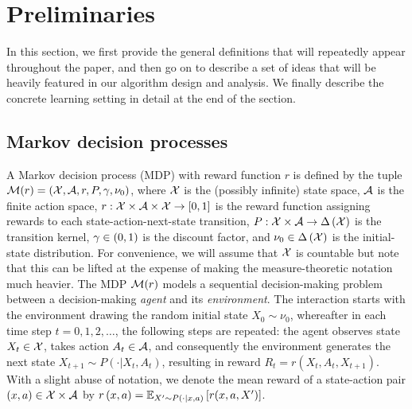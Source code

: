 \vspace{-2mm}
\section{Preliminaries}
\vspace{-1mm}

In this section, we first provide the general definitions that will repeatedly appear throughout the paper, and then go on to describe a set of ideas that will be heavily featured in our algorithm design and analysis. We finally describe the concrete learning setting in detail at the end of the section.

\vspace{-2mm}
\subsection{Markov decision processes}

A Markov decision process (MDP) with reward function $r$ is defined by the tuple $\cM(r) = \spr{\cX, \cA, r, P, \gamma, \nu_0}$, where $\cX$ is the (possibly infinite) state space, $\cA$ is the finite action space, $r: \cX \times \cA \times \cX \rightarrow \sbr{0, 1}$ is the reward function assigning rewards to each state-action-next-state transition, $P: \cX \times \cA \rightarrow \Delta \spr{\cX}$ is the transition kernel, $\gamma \in \spr{0, 1}$ is the discount factor, and $\nu_0 \in \Delta \spr{\cX}$ is the initial-state distribution. For convenience, we will assume that $\cX$ is countable but note that this can be lifted at the expense of making the measure-theoretic notation much heavier.
%
The MDP $\cM(r)$ models a sequential decision-making problem between a decision-making \emph{agent} and its \emph{environment}. The interaction starts with the environment drawing the random initial state $X_0\sim\nu_0$, whereafter in each time step $t = 0, 1, 2, \dots$, the following steps are repeated: the agent observes state $X_t \in \cX$, takes action $A_t \in \cA$, and consequently the environment generates the next state $X_{t + 1} \sim P(\cdot | X_t, A_t)$, resulting in reward $R_t = r(X_t, A_t, X_{t + 1})$. With a slight abuse of notation, we denote the mean reward of a state-action pair $\spr{x, a} \in \cX \times \cA$ by $r \spr{x, a} = \EEs{r(x,a,X')}{X'\sim P(\cdot|x,a)}$.

